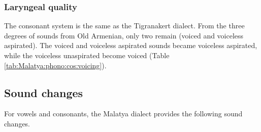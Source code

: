 \subsubsection{Laryngeal quality}

The consonant system is the same as the Tigranakert dialect. From the three degrees of sounds from Old Armenian, only two remain (voiced and voiceless aspirated). The voiced and voiceless aspirated sounds became voiceless aspirated, while the voiceless unaspirated become voiced (Table \ref{tab:Malatya:phono:cos:voicing}).




\begin{table}[H]
	\centering
	\caption{Laryngeal quality of stops and affricates in the Malatya dialect}
	\label{tab:Malatya:phono:cos:voicing}
\end{table}

\subsection{Sound changes}

For vowels and consonants, the Malatya dialect provides the following sound changes. 

\begin{adjarianpage}\label{page:197}\end{adjarianpage}%


